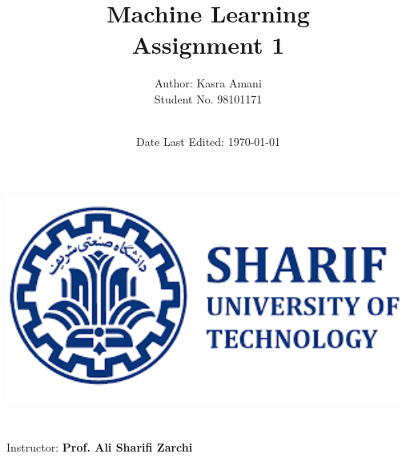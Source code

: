 \title{\Large Machine Learning  \\[0.5cm]
        \bf\Large Assignment 1}
\author{\large Author: Kasra Amani\\ \normalsize Student No. 98101171 \\ \ \\}
\date{\large Date Last Edited: \today}

\makeatletter
    \begin{titlepage}
        \begin{center}
	   { \includegraphics[width=13cm]{sharif.png}}
	   {\ \\ \ \\}
        \vbox{}\vspace{5cm}
            {\@title }\\[3cm] 
            {\@author}
            {\large Instructor: \bf Prof. Ali Sharifi Zarchi\\ \ \\}
            {\@date\\}

        \end{center}
    \end{titlepage}
\makeatother